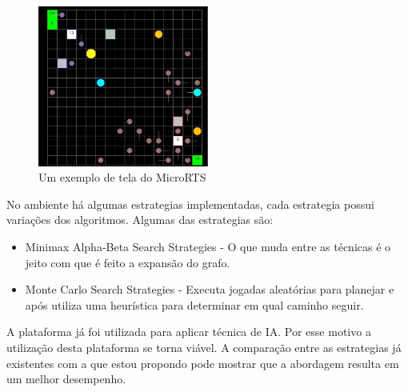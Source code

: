  \begin{figure}[ht]
 	\centering
 	\includegraphics[width=0.5\textwidth]{fig/microrts.pdf}
 	\caption{Um exemplo de tela do MicroRTS}
 	\label{fig:microrts}
 \end{figure} 
 
 No ambiente há algumas estrategias implementadas, cada estrategia possui variações dos algoritmos. Algumas das estrategias são:
 \begin{itemize}
 	\item Minimax Alpha-Beta Search Strategies - O que muda entre as técnicas é o jeito com que é feito a expansão do grafo.
 	\item Monte Carlo Search Strategies - Executa jogadas aleatórias para planejar e após utiliza uma heurística para determinar em qual caminho seguir.
 \end{itemize}
 
 A plataforma já foi utilizada para aplicar técnica de IA. Por esse motivo a utilização desta plataforma se torna viável. A comparação entre as estrategias já existentes com a que estou propondo pode mostrar que a abordagem resulta em um melhor desempenho. 
 
 
 
 